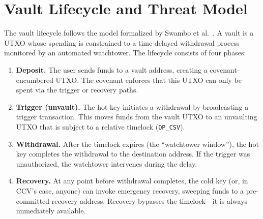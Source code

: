 \section{Vault Lifecycle and Threat Model} \label{se:vault_lifecycle}

The vault lifecycle follows the model formalized by Swambo et al.~\cite{SHMB20}. A
vault is a UTXO whose spending is constrained to a time-delayed withdrawal process
monitored by an automated watchtower. The lifecycle consists of four phases:

\begin{enumerate}
\item \textbf{Deposit.} The user sends funds to a vault address, creating a covenant-
  encumbered UTXO. The covenant enforces that this UTXO can only be spent via the
  trigger or recovery paths.

\item \textbf{Trigger (unvault).} The hot key initiates a withdrawal by broadcasting
  a trigger transaction. This moves funds from the vault UTXO to an unvaulting UTXO
  that is subject to a relative timelock (\texttt{OP\_CSV}).

\item \textbf{Withdrawal.} After the timelock expires (the ``watchtower window''),
  the hot key completes the withdrawal to the destination address. If the trigger was
  unauthorized, the watchtower intervenes during the delay.

\item \textbf{Recovery.} At any point before withdrawal completes, the cold key (or, in
  CCV's case, anyone) can invoke emergency recovery, sweeping funds to a pre-committed
  recovery address. Recovery bypasses the timelock---it is always immediately available.
\end{enumerate}

